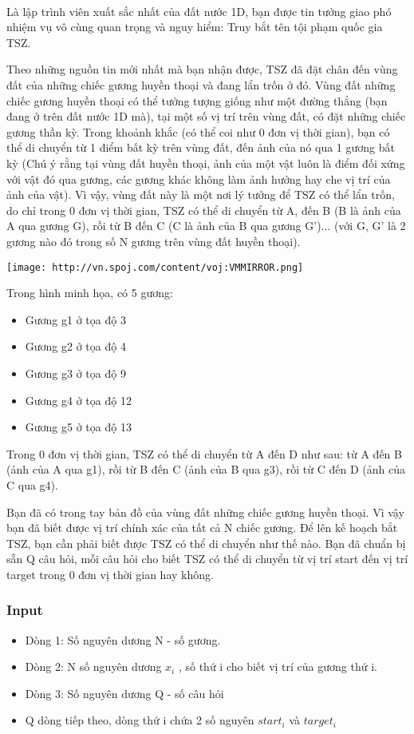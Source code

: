 

 

Là lập trình viên xuất sắc nhất của đất nước 1D, bạn được tin tưởng giao phó nhiệm vụ vô cùng quan trọng và nguy hiểm: Truy bắt tên tội phạm quốc gia TSZ.

Theo những nguồn tin mới nhất mà bạn nhận được, TSZ đã đặt chân đến vùng đất của những chiếc gương huyền thoại và đang lẩn trốn ở đó. Vùng đất những chiếc gương huyền thoại có thể tưởng tượng giống như một đường thẳng (bạn đang ở trên đất nước 1D mà), tại một số vị trí trên vùng đất, có đặt những chiếc gương thần kỳ. Trong khoảnh khắc (có thể coi như 0 đơn vị thời gian), bạn có thể di chuyển từ 1 điểm bất kỳ trên vùng đất, đến ảnh của nó qua 1 gương bất kỳ (Chú ý rằng tại vùng đất huyền thoại, ảnh của một vật luôn là điểm đối xứng với vật đó qua gương, các gương khác không làm ảnh hưởng hay che vị trí của ảnh của vật). Vì vậy, vùng đất này là một nơi lý tưởng để TSZ có thể lẩn trốn, do chỉ trong 0 đơn vị thời gian, TSZ có thể di chuyển từ A, đến B (B là ảnh của A qua gương G), rồi từ B đến C (C là ảnh của B qua gương G')... (với G, G' là 2 gương nào đó trong số N gương trên vùng đất huyền thoại).


\texttt{[image: http://vn.spoj.com/content/voj:VMMIRROR.png]}

Trong hình minh họa, có 5 gương:
\begin{itemize}
	\item Gương g1 ở tọa độ 3
	\item Gương g2 ở tọa độ 4
	\item Gương g3 ở tọa độ 9
	\item Gương g4 ở tọa độ 12
	\item Gương g5 ở tọa độ 13
\end{itemize}

Trong 0 đơn vị thời gian, TSZ có thể di chuyển từ A đến D như sau: từ A đến B (ảnh của A qua g1), rồi từ B đến C (ảnh của B qua g3), rồi từ C đến D (ảnh của C qua g4).

Bạn đã có trong tay bản đồ của vùng đất những chiếc gương huyền thoại. Vì vậy bạn đã biết được vị trí chính xác của tất cả N chiếc gương. Để lên kế hoạch bắt TSZ, bạn cần phải biết được TSZ có thể di chuyển như thế nào. Bạn đã chuẩn bị sẵn Q câu hỏi, mỗi câu hỏi cho biết TSZ có thể di chuyển từ vị trí start đến vị trí target trong 0 đơn vị thời gian hay không.

\subsubsection{Input}
\begin{itemize}
	\item Dòng 1: Số nguyên dương N - số gương.
	\item Dòng 2: N số nguyên dương $x_{i}$ , số thứ i cho biết vị trí của gương thứ i.
	\item Dòng 3: Số nguyên dương Q - số câu hỏi
	\item Q dòng tiếp theo, dòng thứ i chứa 2 số nguyên $start_{i}$ và $target_{i}$
\end{itemize}

